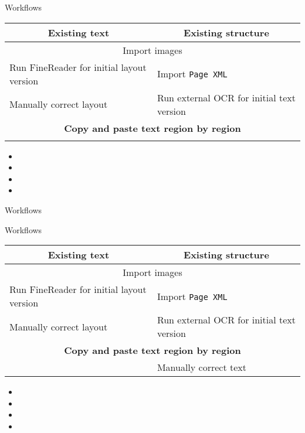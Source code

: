 \documentclass{bbawslides}
\begin{document}
\begin{bbawslide}{Workflows}
  \vspace*{2mm}%
  \centerslidestrue%
  \begin{center}
    \begin{tabular}{|l|l|}
      \hline
      \multicolumn{1}{|c|}{\textbf{Existing text}} & \multicolumn{1}{c|}{\textbf{Existing structure}} \\
      \hline
      \hline
      \multicolumn{2}{|c|}{Import images} \\
      \hline
      Run FineReader for initial layout version & Import \texttt{Page XML} \\
      \hline
      Manually correct layout & Run external OCR for initial text version \\
      \hline
      \multicolumn{2}{|c|}{\bf Copy and paste text region by region} \\
      \hline
      & \phantom{Manually correct text} \\
      \hline
    \end{tabular}
  \end{center}
  \begin{itemize}
    \item
    \item
    \item
    \item
  \end{itemize}
\end{bbawslide}

\begin{bbawslide}{Workflows}
  \vspace*{3mm}%
\end{bbawslide}

\begin{bbawslide}{Workflows}
  \vspace*{2mm}%
  \centerslidestrue%
  \begin{center}
    \begin{tabular}{|l|l|}
      \hline
      \multicolumn{1}{|c|}{\textbf{Existing text}} & \multicolumn{1}{c|}{\textbf{Existing structure}} \\
      \hline
      \hline
      \multicolumn{2}{|c|}{Import images} \\
      \hline
      Run FineReader for initial layout version & Import \texttt{Page XML} \\
      \hline
      Manually correct layout & Run external OCR for initial text version \\
      \hline
      \multicolumn{2}{|c|}{\bf Copy and paste text region by region} \\
      \hline
      & Manually correct text \\
      \hline
    \end{tabular}
  \end{center}
  \begin{itemize}
    \item
    \item
    \item
    \item
  \end{itemize}
\end{bbawslide}
\end{document}
